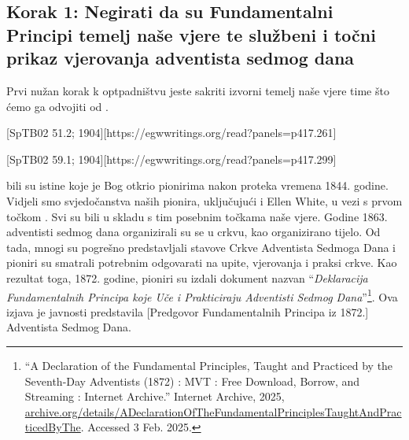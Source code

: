 \subsection*{Korak 1: Negirati da su Fundamentalni Principi temelj naše vjere te službeni i točni prikaz vjerovanja adventista sedmog dana}

Prvi nužan korak k optpadništvu jeste sakriti izvorni temelj naše vjere time što ćemo ga odvojiti od .

[SpTB02 51.2; 1904][https://egwwritings.org/read?panels=p417.261]

[SpTB02 59.1; 1904][https://egwwritings.org/read?panels=p417.299]

 bili su istine koje je Bog otkrio pionirima nakon proteka vremena 1844. godine. Vidjeli smo svjedočanstva naših pionira, uključujući i Ellen White, u vezi s prvom točkom . Svi su bili u skladu s tim posebnim točkama naše vjere. Godine 1863. adventisti sedmog dana organizirali su se u crkvu, kao organizirano tijelo. Od tada, mnogi su pogrešno predstavljali stavove Crkve Adventista Sedmoga Dana i pioniri su smatrali potrebnim odgovarati na upite,  vjerovanja i praksi crkve. Kao rezultat toga, 1872. godine, pioniri su izdali dokument nazvan “\textit{Deklaracija Fundamentalnih Principa koje Uče i Prakticiraju Adventisti Sedmog Dana}”\footnote{“A Declaration of the Fundamental Principles, Taught and Practiced by the Seventh-Day Adventists (1872) : MVT : Free Download, Borrow, and Streaming : Internet Archive.” Internet Archive, 2025, \href{https://archive.org/details/ADeclarationOfTheFundamentalPrinciplesTaughtAndPracticedByThe}{archive.org/details/ADeclarationOfTheFundamentalPrinciplesTaughtAndPracticedByThe}. Accessed 3 Feb. 2025.}. Ova izjava je javnosti predstavila [Predgovor Fundamentalnih Principa iz 1872.] Adventista Sedmog Dana.

